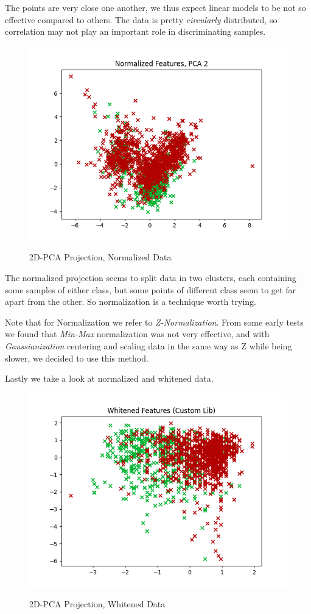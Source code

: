 \documentclass[12pt, twocolumn]{article}
\begin{document}
The points are very close one another, we thus expect linear models to be not so effective compared to others.
The data is pretty {\it circularly} distributed, so correlation may not play an important role in discriminating samples.

\begin{figure}[H] 
    {\includegraphics[width=\linewidth]{2DNorm.png}}
    \caption{2D-PCA Projection, Normalized Data}
    \label{fig:2DNORM}
\end{figure}

The normalized projection seems to split data in two clusters, each containing some samples of either class, but some points of different class seem to get far apart from the other.
So normalization is a technique worth trying.

Note that for Normalization we refer to {\it Z-Normalization}. 
From some early tests we found that {\it Min-Max} normalization was not very effective, and with {\it Gaussianization} centering and scaling data in the same way as Z while being slower, we decided to use this method.

Lastly we take a look at normalized and whitened data.

\begin{figure}[H] 
    {\includegraphics[width=\linewidth]{2DWhitened.png}}
    \label{fig:2DWHI}
    \caption{2D-PCA Projection, Whitened Data}
\end{figure}
\end{document}
